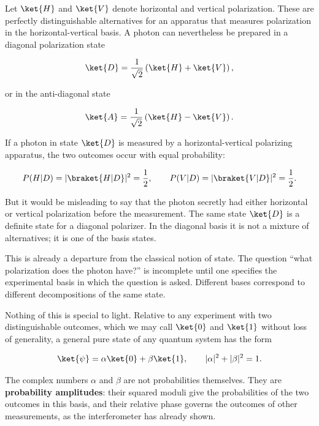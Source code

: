 Let $\ket{H}$ and $\ket{V}$ denote horizontal and vertical polarization. These are perfectly distinguishable alternatives for an apparatus that measures polarization in the horizontal-vertical basis. A photon can nevertheless be prepared in a diagonal polarization state
\begin{linenomath}
    \begin{equation}
        \ket{D}=\frac{1}{\sqrt{2}}\left(\ket{H}+\ket{V}\right),
    \end{equation}
\end{linenomath}
or in the anti-diagonal state
\begin{linenomath}
    \begin{equation}
        \ket{A}=\frac{1}{\sqrt{2}}\left(\ket{H}-\ket{V}\right).
    \end{equation}
\end{linenomath}
If a photon in state $\ket{D}$ is measured by a horizontal-vertical polarizing apparatus, the two outcomes occur with equal probability:
\begin{linenomath}
    \begin{equation}
        P(H|D)=|\braket{H|D}|^2=\frac12,\qquad
        P(V|D)=|\braket{V|D}|^2=\frac12.
    \end{equation}
\end{linenomath}
But it would be misleading to say that the photon secretly had either horizontal or vertical polarization before the measurement. The same state $\ket{D}$ is a definite state for a diagonal polarizer. In the diagonal basis it is not a mixture of alternatives; it is one of the basis states.

This is already a departure from the classical notion of state. The question ``what polarization does the photon have?'' is incomplete until one specifies the experimental basis in which the question is asked. Different bases correspond to different decompositions of the same state.

Nothing of this is special to light. Relative to any experiment with two distinguishable outcomes, which we may call $\ket{0}$ and $\ket{1}$ without loss of generality, a general pure state of any quantum system has the form
\begin{linenomath}
    \begin{equation}
        \ket{\psi}=\alpha\ket{0}+\beta\ket{1},
        \qquad |\alpha|^2+|\beta|^2=1.
    \end{equation}
\end{linenomath}
The complex numbers $\alpha$ and $\beta$ are not probabilities themselves. They are \textbf{probability amplitudes}: their squared moduli give the probabilities of the two outcomes in this basis, and their relative phase governs the outcomes of other measurements, as the interferometer has already shown.

